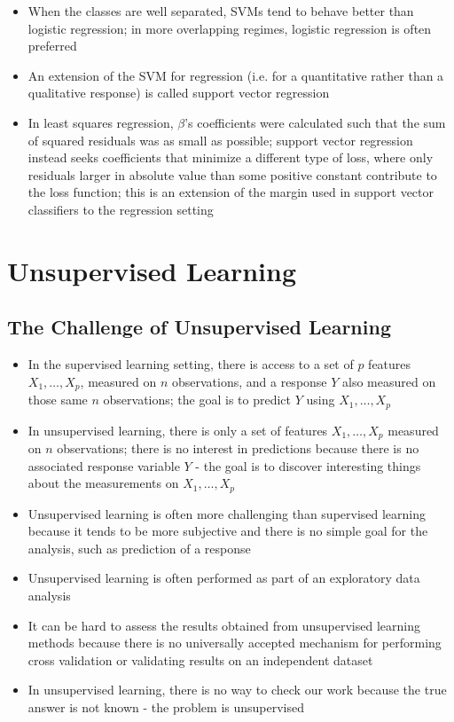 \documentclass[12pt]{article}
\begin{document}
\begin{itemize}
\item When the classes are well separated, SVMs tend to behave better than logistic regression; in more overlapping regimes, logistic regression is often preferred 
\item An extension of the SVM for regression (i.e. for a quantitative rather than a qualitative response) is called support vector regression
\item In least squares regression, $\beta$'s coefficients were calculated such that the sum of squared residuals was as small as possible; support vector regression instead seeks coefficients that minimize a different type of loss, where only residuals larger in absolute value than some positive constant contribute to the loss function; this is an extension of the margin used in support vector classifiers to the regression setting
\end{itemize}

\section{Unsupervised Learning}
\subsection{The Challenge of Unsupervised Learning}
\begin{itemize}
\item In the supervised learning setting, there is access to a set of $p$ features $X_1,\dots,X_p$, measured on $n$ observations, and a response $Y$ also measured on those same $n$ observations; the goal is to predict $Y$ using $X_1,\dots,X_p$
\item In unsupervised learning, there is only a set of features $X_1,\dots, X_p$ measured on $n$ observations; there is no interest in predictions because there is no associated response variable $Y$ - the goal is to discover interesting things about the measurements on $X_1,\dots,X_p$
\item Unsupervised learning is often more challenging than supervised  learning because it tends to be more subjective and there is no simple goal for the analysis, such as prediction of a response 
\item Unsupervised learning is often performed as part of an exploratory data analysis
\item It can be hard to assess the results obtained from unsupervised learning methods because there is no universally accepted mechanism for performing cross validation or validating results on an independent dataset 
\item In unsupervised learning, there is no way to check our work because the true answer is not known - the problem is unsupervised 
\end{itemize}
\end{document}
